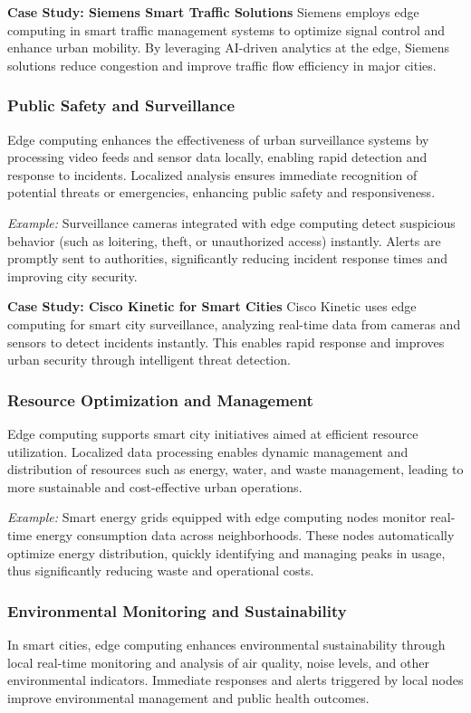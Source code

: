 \documentclass[runningheads]{llncs}
\begin{document}
\noindent\textbf{Case Study: Siemens Smart Traffic Solutions}
Siemens employs edge computing in smart traffic management systems to optimize signal control and enhance urban mobility. By leveraging AI-driven analytics at the edge, Siemens solutions reduce congestion and improve traffic flow efficiency in major cities.

\subsubsection{Public Safety and Surveillance}
Edge computing enhances the effectiveness of urban surveillance systems by processing video feeds and sensor data locally, enabling rapid detection and response to incidents. Localized analysis ensures immediate recognition of potential threats or emergencies, enhancing public safety and responsiveness.

\noindent\textit{Example:} Surveillance cameras integrated with edge computing detect suspicious behavior (such as loitering, theft, or unauthorized access) instantly. Alerts are promptly sent to authorities, significantly reducing incident response times and improving city security.

\noindent\textbf{Case Study: Cisco Kinetic for Smart Cities}
Cisco Kinetic uses edge computing for smart city surveillance, analyzing real-time data from cameras and sensors to detect incidents instantly. This enables rapid response and improves urban security through intelligent threat detection.

\subsubsection{Resource Optimization and Management}
Edge computing supports smart city initiatives aimed at efficient resource utilization. Localized data processing enables dynamic management and distribution of resources such as energy, water, and waste management, leading to more sustainable and cost-effective urban operations.

\noindent\textit{Example:} Smart energy grids equipped with edge computing nodes monitor real-time energy consumption data across neighborhoods. These nodes automatically optimize energy distribution, quickly identifying and managing peaks in usage, thus significantly reducing waste and operational costs.

\subsubsection{Environmental Monitoring and Sustainability}
In smart cities, edge computing enhances environmental sustainability through local real-time monitoring and analysis of air quality, noise levels, and other environmental indicators. Immediate responses and alerts triggered by local nodes improve environmental management and public health outcomes.
\end{document}

